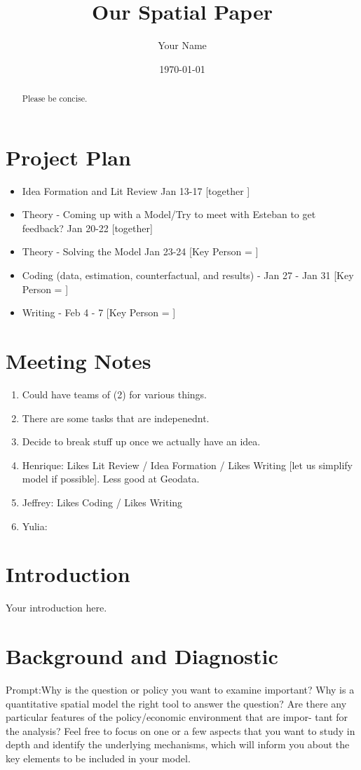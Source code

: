 \documentclass{article}
\title{Our Spatial Paper}
\author{Your Name}
\date{\today}
\begin{document}
\maketitle

\begin{abstract}
    Please be concise.
\end{abstract}

\section{Project Plan}
\begin{itemize}
    \item Idea Formation and Lit Review  Jan 13-17  [together ]
    \item Theory - Coming up with a Model/Try to meet with Esteban to get feedback? Jan 20-22 [together]
    \item Theory - Solving the Model Jan 23-24 [Key Person = ]
    \item Coding (data, estimation, counterfactual, and results) - Jan 27 - Jan 31  [Key Person = ]
    \item Writing -  Feb 4 - 7  [Key Person = ]
\end{itemize}
\section{Meeting Notes}
\begin{enumerate}
    \item  Could have teams of (2) for various things. 
    \item There are some tasks that are indepenednt. 
    \item Decide to break stuff up once we actually have an idea.
    \item Henrique: Likes Lit Review / Idea Formation / Likes Writing [let us simplify model if possible]. Less good at Geodata.
    \item Jeffrey: Likes Coding / Likes Writing
    \item Yulia: 
\end{enumerate}

\section{Introduction}
\label{sec:intro}
Your introduction here.

\section{Background and Diagnostic}
Prompt:Why is the question or policy you want to examine
important? Why is a quantitative spatial model the right tool to answer the question?
Are there any particular features of the policy/economic environment that are impor-
tant for the analysis? Feel free to focus on one or a few aspects that you want to study
in depth and identify the underlying mechanisms, which will inform you about the key
elements to be included in your model.
\end{document}
